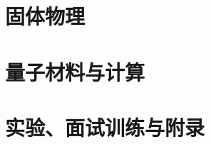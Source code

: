 \documentclass[a4paper,openany,fontset=fandol,zihao=-4]{ctexbook}
\newcommand{\currentparttitle}{复习导航}
\begin{document}
\part{固体物理}
\label{part:solid-state}
\renewcommand{\currentparttitle}{固体物理}




\part{量子材料与计算}
\label{part:quantum-materials}
\renewcommand{\currentparttitle}{量子材料与计算}



\part{实验、面试训练与附录}
\label{part:interview}
\renewcommand{\currentparttitle}{实验、面试训练与附录}







\nocite{*}
\printbibliography[heading=bibintoc,title={参考文献与延伸阅读}]
\end{document}

